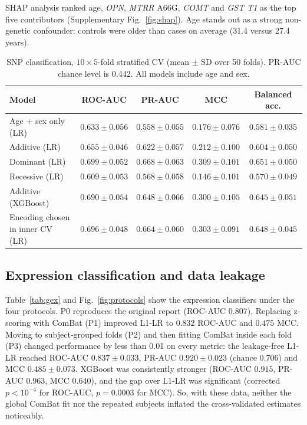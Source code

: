 \documentclass[11pt]{article}
\begin{document}
SHAP analysis ranked age, \textit{OPN}, \textit{MTRR} A66G, \textit{COMT} and \textit{GST T1} as the top five contributors (Supplementary Fig.~\ref{fig:shap}). Age stands out as a strong non-genetic confounder: controls were older than cases on average (31.4 versus 27.4 years).

\begin{table}[t]
\centering
\caption{SNP classification, $10\times5$-fold stratified CV (mean $\pm$ SD over 50 folds). PR-AUC chance level is 0.442. All models include age and sex.}
\label{tab:snp}
\footnotesize
\begin{tabular}{lcccc}
\toprule
Model & ROC-AUC & PR-AUC & MCC & Balanced acc. \\
\midrule
Age + sex only (LR)          & $0.633 \pm 0.056$ & $0.558 \pm 0.055$ & $0.176 \pm 0.076$ & $0.581 \pm 0.035$ \\
Additive (LR)                & $0.655 \pm 0.046$ & $0.622 \pm 0.057$ & $0.212 \pm 0.100$ & $0.604 \pm 0.050$ \\
Dominant (LR)                & $\mathbf{0.699 \pm 0.052}$ & $\mathbf{0.668 \pm 0.063}$ & $\mathbf{0.309 \pm 0.101}$ & $\mathbf{0.651 \pm 0.050}$ \\
Recessive (LR)               & $0.609 \pm 0.053$ & $0.568 \pm 0.058$ & $0.146 \pm 0.101$ & $0.570 \pm 0.049$ \\
Additive (XGBoost)           & $0.690 \pm 0.054$ & $0.648 \pm 0.066$ & $0.300 \pm 0.105$ & $0.645 \pm 0.051$ \\
Encoding chosen in inner CV (LR) & $0.696 \pm 0.048$ & $0.664 \pm 0.060$ & $0.303 \pm 0.091$ & $0.648 \pm 0.045$ \\
\bottomrule
\end{tabular}
\end{table}

\subsection{Expression classification and data leakage}

Table~\ref{tab:gex} and Fig.~\ref{fig:protocols} show the expression classifiers under the four protocols. P0 reproduces the original report (ROC-AUC $0.807$). Replacing z-scoring with ComBat (P1) improved L1-LR to $0.832$ ROC-AUC and $0.475$ MCC. Moving to subject-grouped folds (P2) and then fitting ComBat inside each fold (P3) changed performance by less than 0.01 on every metric: the leakage-free L1-LR reached ROC-AUC $0.837 \pm 0.033$, PR-AUC $0.920 \pm 0.023$ (chance 0.706) and MCC $0.485 \pm 0.073$. XGBoost was consistently stronger (ROC-AUC $0.915$, PR-AUC $0.963$, MCC $0.640$), and the gap over L1-LR was significant (corrected $p < 10^{-4}$ for ROC-AUC, $p = 0.0003$ for MCC). So, with these data, neither the global ComBat fit nor the repeated subjects inflated the cross-validated estimates noticeably.
\end{document}
